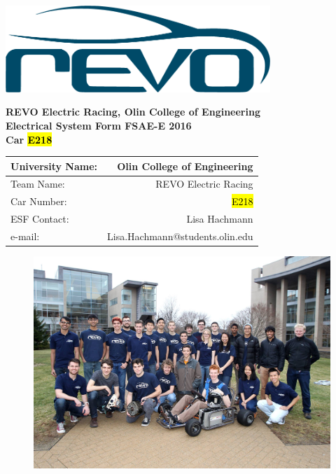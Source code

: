 \documentclass{article}
\DeclareRobustCommand{\hlr}[1]{{\sethlcolor{red}\hl{#1}}}
\begin{document}
\renewcommand{\headrulewidth}{0pt}
\chead{}
\rhead{\rightmark}
\rfoot{\thepage}

\begin{titlepage}

    \centering
    \vfill
    \includegraphics[width=10cm]{revo.png}

    {\bfseries\Large
        REVO Electric Racing, Olin College of Engineering\\
        \vskip2cm
        Electrical System Form FSAE-E 2016\\
        Car \hlr{E218}\\
    }

    \begin{table}[H]
        \centering
        \label{my-label}
        \begin{tabular}{lr}
        University Name: & Olin College of Engineering \\ \hline
        Team Name: & REVO Electric Racing \\ \hline
        Car Number: & \hlr{E218} \\ \hline
        ESF Contact: & Lisa Hachmann \\ \hline
        e-mail: & Lisa.Hachmann@students.olin.edu \\ \hline
        \end{tabular}
    \end{table}
\vfill

\begin{figure}[H]
\centering
\includegraphics[width = 0.9 \textwidth]{teamPhoto}
\end{figure}

\end{titlepage}
\end{document}
